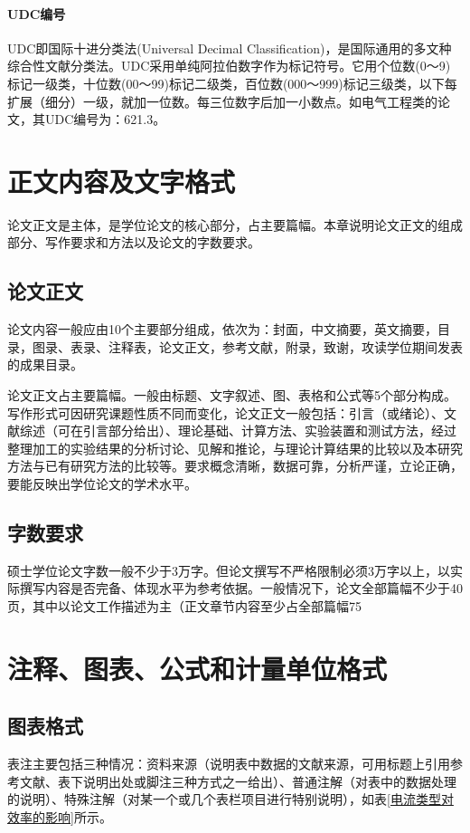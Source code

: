 \documentclass{cqupt_thesis}
\begin{document}
    \subsubsection{UDC编号}
    UDC即国际十进分类法(Universal Decimal Classification)，是国际通用的多文种综合性文献分类法。UDC采用单纯阿拉伯数字作为标记符号。它用个位数(0～9)标记一级类，十位数(00～99)标记二级类，百位数(000～999)标记三级类，以下每扩展（细分）一级，就加一位数。每三位数字后加一小数点。如电气工程类的论文，其UDC编号为：621.3。


    \chapter{正文内容及文字格式}
    论文正文是主体，是学位论文的核心部分，占主要篇幅。本章说明论文正文的组成部分、写作要求和方法以及论文的字数要求。


    \section{论文正文}
    论文内容一般应由10个主要部分组成，依次为：封面，中文摘要，英文摘要，目录，图录、表录、注释表，论文正文，参考文献，附录，致谢，攻读学位期间发表的成果目录。

    论文正文占主要篇幅。一般由标题、文字叙述、图、表格和公式等5个部分构成。写作形式可因研究课题性质不同而变化，论文正文一般包括：引言（或绪论）、文献综述（可在引言部分给出）、理论基础、计算方法、实验装置和测试方法，经过整理加工的实验结果的分析讨论、见解和推论，与理论计算结果的比较以及本研究方法与已有研究方法的比较等。要求概念清晰，数据可靠，分析严谨，立论正确，要能反映出学位论文的学术水平。


    \section{字数要求}
    硕士学位论文字数一般不少于3万字。但论文撰写不严格限制必须3万字以上，以实际撰写内容是否完备、体现水平为参考依据。一般情况下，论文全部篇幅不少于40页，其中以论文工作描述为主（正文章节内容至少占全部篇幅75%


    \chapter{注释、图表、公式和计量单位格式}


    \section{图表格式}
    表注主要包括三种情况：资料来源（说明表中数据的文献来源，可用标题上引用参考文献、表下说明出处或脚注三种方式之一给出）、普通注解（对表中的数据处理的说明）、特殊注解（对某一个或几个表栏项目进行特别说明），如表\ref{电流类型对效率的影响}所示。
\end{document}
